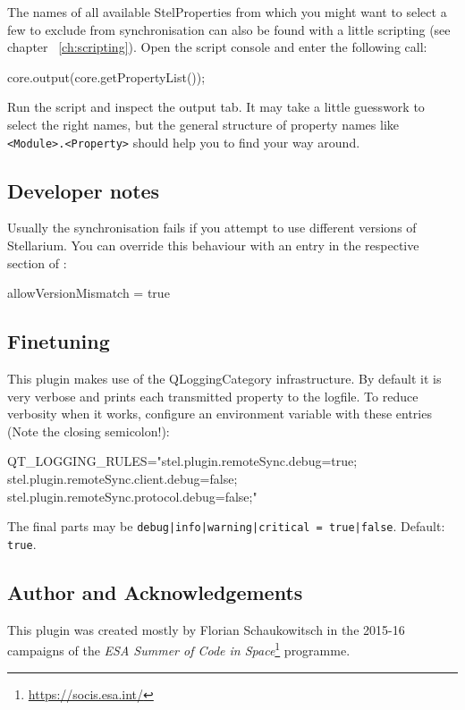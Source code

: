 The names of all available StelProperties from which you might want to select a few to exclude  
from synchronisation can also be found with a little scripting (see chapter ~\ref{ch:scripting}). 
Open the script console  and enter the following call:
\begin{script}
core.output(core.getPropertyList());
\end{script}
Run the script and inspect the output tab. It may take a little guesswork to select the right names, 
but the general structure of property names like 
\texttt{<Module>.<Property>} should help you to find your way around.

\subsection{Developer notes}

Usually the synchronisation fails if you attempt to use different
versions of Stellarium. You can override this behaviour
 with an entry in the respective section of
:

\begin{configfile}[\scriptsize]
  [RemoteSync]
  allowVersionMismatch = true
\end{configfile}

\subsection{Finetuning}

This plugin makes use of the QLoggingCategory infrastructure. By default it is very verbose and prints each transmitted property to the logfile.
To reduce verbosity when it works, configure an environment variable with these entries (Note the closing semicolon!):
\begin{commands}[\scriptsize]
QT_LOGGING_RULES="stel.plugin.remoteSync.debug=true;
		  stel.plugin.remoteSync.client.debug=false;
		  stel.plugin.remoteSync.protocol.debug=false;"
\end{commands}

The final parts may be \texttt{debug|info|warning|critical = true|false}. Default: \texttt{true}.


\subsection*{Author and Acknowledgements}

This plugin was created mostly by Florian Schaukowitsch in the 2015-16 campaigns of the 
\emph{ESA Summer of Code in Space}\footnote{\url{https://socis.esa.int/}} programme. 

